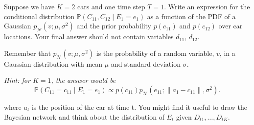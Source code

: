 \item {}
Suppose we have $K=2$ cars and one time step $T=1$. Write an expression for the
conditional distribution $\mathbb P(C_{11}, C_{12} \mid E_1 = e_1)$ as a
function of the PDF of a Gaussian $p_{\mathcal N}(v; \mu, \sigma^2)$
and the prior probability $p(c_{11})$ and $p(c_{12})$ over car locations. Your
final answer should not contain variables $d_{11}$, $d_{12}$.

Remember that $p_{\mathcal N}(v; \mu, \sigma^2)$ is the probability of
a random variable, $v$, in a Gaussian distribution with mean $\mu$ and standard
deviation $\sigma$.

{\em Hint: for $K=1$, the answer would be
\[\mathbb P(C_{11} = c_{11} \mid E_1 = e_1) \propto p(c_{11}) p_{\mathcal N}
(e_{11}; \|a_1 - c_{11}\|, \sigma^2).\]

where $a_t$ is the position of the car at time t. You might find it useful to
draw the Bayesian network and think about the distribution of $E_t$ given
$D_{t1}, \dots, D_{tK}$.}
